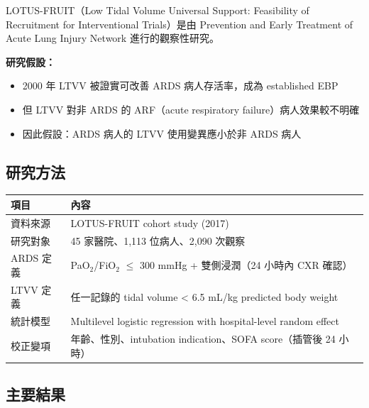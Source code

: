 \documentclass[12pt,a4paper]{article}
\begin{document}
LOTUS-FRUIT（Low Tidal Volume Universal Support: Feasibility of Recruitment for Interventional Trials）是由 Prevention and Early Treatment of Acute Lung Injury Network 進行的觀察性研究。

\textbf{研究假設：}
\begin{itemize}
    \item 2000 年 LTVV 被證實可改善 ARDS 病人存活率，成為 established EBP
    \item 但 LTVV 對非 ARDS 的 ARF（acute respiratory failure）病人效果較不明確
    \item 因此假設：ARDS 病人的 LTVV 使用變異應小於非 ARDS 病人
\end{itemize}

\subsection{研究方法}

\begin{longtable}{p{4cm}p{10cm}}
\toprule
\textbf{項目} & \textbf{內容} \\
\midrule
\endfirsthead
\bottomrule
\endfoot

資料來源 & LOTUS-FRUIT cohort study (2017) \\
\midrule
研究對象 & 45 家醫院、1,113 位病人、2,090 次觀察 \\
\midrule
ARDS 定義 & PaO$_2$/FiO$_2$ $\leq$ 300 mmHg + 雙側浸潤（24 小時內 CXR 確認）\\
\midrule
LTVV 定義 & 任一記錄的 tidal volume < 6.5 mL/kg predicted body weight \\
\midrule
統計模型 & Multilevel logistic regression with hospital-level random effect \\
\midrule
校正變項 & 年齡、性別、intubation indication、SOFA score（插管後 24 小時）\\
\bottomrule
\end{longtable}

\subsection{主要結果}
\end{document}
